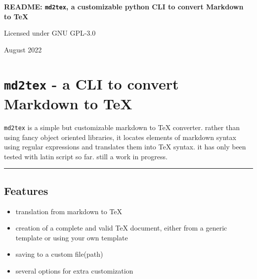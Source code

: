 \documentclass[a4paper, 12pt, twoside]{book}
\begin{document}
	\onehalfspacing

	\begin{titlepage}
		\begin{center}
			\bigskip

			\vfill

			\begin{Huge}
				\textbf{README: \texttt{md2tex}, a customizable python CLI to convert Markdown to TeX}
			\end{Huge}

			\vfill

			\begin{large}
				Licensed under GNU GPL-3.0

				\bigskip

				August 2022
			\end{large}

		\end{center}
	\end{titlepage}

\chapter*{\texttt{md2tex} - a CLI to convert Markdown to TeX}

\texttt{md2tex} is a simple but customizable markdown to TeX converter. rather than using fancy object oriented 
libraries, it locates elements of markdown syntax using regular expressions and translates them into TeX syntax.
it has only been tested with latin script so far. still a work in progress.

\par\noindent\rule{\linewidth}{0.4pt}
\section*{Features}

\begin{itemize}
\item translation from markdown to TeX
\item creation of a complete and valid TeX document, either from a generic template or using your own template
\item saving to a custom file(path)
\item several options for extra customization 
\end{itemize}
\end{document}
